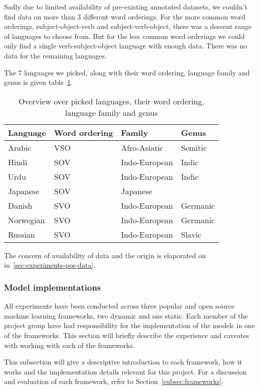Sadly due to limited availability of pre-existing annotated datasets, we
couldn't find data on more than 3 different word orderings. For the more common
word orderings, subject-object-verb and subject-verb-object, there was a descent
range of languages to choose from. But for the less common word orderings we
could only find a single verb-subject-object language with enough data. There
was no data for the remaining languages. 

The 7 languages we picked, along with their word ordering, language family and
genus is given table~\ref{table:langfam}.

\begin{table}[!ht]
  \centering
  \begin{tabular}{llll}
    \textbf{Language} & \textbf{Word ordering} & \textbf{Family} & \textbf{Genus} \\
    \midrule
    Arabic    & VSO & Afro-Asiatic  & Semitic \\
    Hindi     & SOV & Indo-European & Indic \\
    Urdu      & SOV & Indo-European & Indic \\
    Japanese  & SOV & Japanese      & \\
    Danish    & SVO & Indo-European & Germanic \\
    Norwegian & SVO & Indo-European & Germanic \\
    Russian   & SVO & Indo-European & Slavic \\
  \end{tabular}
  \caption{Overview over picked languages, their word ordering, language
  family and genus}
  \label{table:langfam}
\end{table}

The concern of availability of data and the origin is elaporated on
in~\ref{sec:experiments-pos-data}.


\subsubsection{Model implementations}

All experiments have been conducted across three popular and open source machine
learning frameworks, two dynamic and one static. Each member of the project
group have had responsibility for the implementation of the models in one of the
frameworks. This section will briefly describe the experience and caveates with
working with each of the frameworks.

This subsection will give a descriptive introduction to each framework, how it
works and the implementation details relevant for this project. For a discussion
and evaluation of each framework, refer to Section~\ref{subsec:frameworks}.

